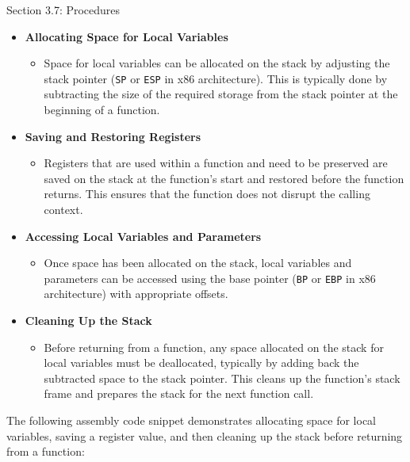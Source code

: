 \begin{notes}{Section 3.7: Procedures}
    \begin{itemize}
        \item \textbf{Allocating Space for Local Variables}
        \begin{itemize}
            \item Space for local variables can be allocated on the stack by adjusting the stack pointer (\texttt{SP} or \texttt{ESP} in x86 architecture). This is typically done by subtracting the 
            size of the required storage from the stack pointer at the beginning of a function.
        \end{itemize}
        \item \textbf{Saving and Restoring Registers}
        \begin{itemize}
            \item Registers that are used within a function and need to be preserved are saved on the stack at the function's start and restored before the function returns. This ensures that the 
            function does not disrupt the calling context.
        \end{itemize}
        \item \textbf{Accessing Local Variables and Parameters}
        \begin{itemize}
            \item Once space has been allocated on the stack, local variables and parameters can be accessed using the base pointer (\texttt{BP} or \texttt{EBP} in x86 architecture) with appropriate 
            offsets.
        \end{itemize}
        \item \textbf{Cleaning Up the Stack}
        \begin{itemize}
            \item Before returning from a function, any space allocated on the stack for local variables must be deallocated, typically by adding back the subtracted space to the stack pointer. This 
            cleans up the function's stack frame and prepares the stack for the next function call.
        \end{itemize}
    \end{itemize}
    
    \begin{highlight}
        The following assembly code snippet demonstrates allocating space for local variables, saving a register value, and then cleaning up the stack before returning from a function:
    

\end{highlight}
\end{notes}
